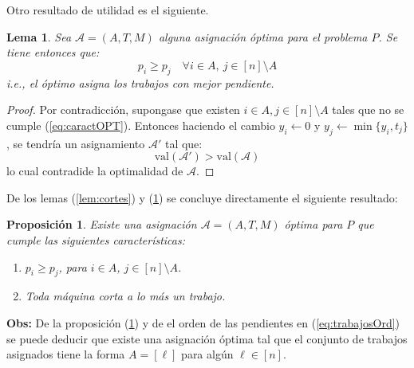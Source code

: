 \documentclass[10pt]{article}
\newcommand{\val}[1]{\text{val}(#1)}
\theoremstyle{plain}
\newtheorem{lem}{Lema}
\newtheorem{prop}{Proposición}
\theoremstyle{definition}
\begin{document}
Otro resultado de utilidad es el siguiente.
\begin{lem}
\label{lem:caracOPT}
Sea $\mathcal{A} = (A,T,M)$ alguna asignación óptima para el problema $P$. Se tiene entonces que: 
\begin{equation}
\label{eq:caractOPT}
p_i \geq p_j \quad \forall i \in A,\ j \in [n]\setminus{A}
\end{equation}
i.e., el óptimo asigna los trabajos con mejor pendiente.
\end{lem}
\begin{proof}
Por contradicción, supongase que existen $i\in A,j \in [n]\setminus{A}$ tales que no se cumple (\ref{eq:caractOPT}). Entonces haciendo el cambio $y_i \gets 0$ y $y_j \gets \min\{y_i,t_j\}$, se tendría un asignamiento $\mathcal{A}'$ tal que:
$$
\val{\mathcal{A}'} > \val{\mathcal{A}}
$$
lo cual contradide la optimalidad de  $\mathcal{A}$.
\end{proof}
De los lemas (\ref{lem:cortes}) y (\ref{lem:caracOPT}) se concluye directamente el siguiente resultado:
\begin{prop}
\label{prop:final}
Existe una asignación $\mathcal{A} = (A,T,M)$ óptima para $P$ que cumple las siguientes características:
\begin{enumerate}
\item  $p_i \geq p_j$, para $i \in A$, $j \in [n]\setminus{A}$.
\item Toda máquina corta a lo más un trabajo.
\end{enumerate}
\end{prop}

\textbf{Obs:} De la proposición (\ref{prop:final}) y de el orden de las pendientes en (\ref{eq:trabajosOrd}) se puede deducir que existe una asignación óptima tal que el conjunto de trabajos asignados tiene la forma $A = [\ell]$ para algún $\ell \in [n]$.\\~\\

%
\end{document}
